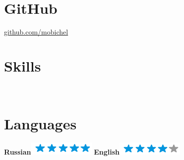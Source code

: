 \documentclass[]{friggeri-cv}
\begin{document}
\begin{aside}
  \section{GitHub}
    \href{https://github.com/mobichel}{github.com/mobichel}
    ~
    \section{Skills}
    ~
    \section{Languages}
        \textbf{Russian}\includegraphics[scale=0.40]{img/5stars.png}
        \textbf{English}\includegraphics[scale=0.40]{img/4stars.png}
    ~
\end{aside}
~
\end{document}
